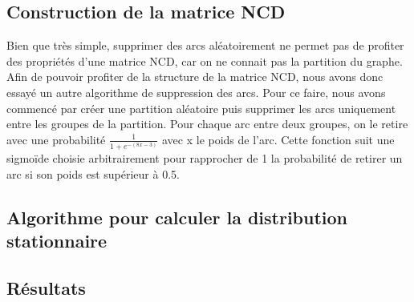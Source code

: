 \documentclass[11pt,oneside,a4paper,french]{article}
\begin{document}
\subsection{Construction de la matrice NCD}

Bien que très simple, supprimer des arcs aléatoirement ne permet pas de profiter des propriétés d'une matrice NCD, car on ne connait pas la partition du graphe.
Afin de pouvoir profiter de la structure de la matrice NCD, nous avons donc essayé un autre algorithme de suppression des arcs.
Pour ce faire, nous avons commencé par créer une partition aléatoire puis supprimer les arcs uniquement entre les groupes de la partition.
Pour chaque arc entre deux groupes, on le retire avec une probabilité $\frac{1}{1+e^{-(8x-3)}}$ avec x le poids de l'arc.
Cette fonction suit une sigmoïde choisie arbitrairement pour rapprocher de 1 la probabilité de retirer un arc si son poids est supérieur à 0.5.

\subsection{Algorithme pour calculer la distribution stationnaire}

\subsection{Résultats}

\newpage
\end{document}
